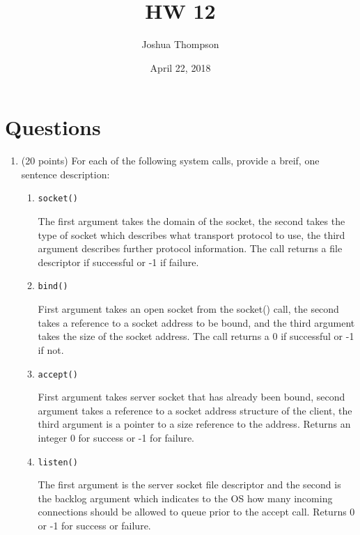 \documentclass{article}[9pt]
\title{HW 12}
\author{Joshua Thompson}
\date{April 22, 2018}
\newenvironment{answerfont}{\fontfamily{qhv}\selectfont}{\par}
\newenvironment{myanswer}{\begin{mdframed}\begin{answerfont}}{\end{answerfont}\end{mdframed}}
\begin{document}
\maketitle
\section*{Questions}
\label{sec:org3ac93b9}

\begin{enumerate}
\item (20 points) For each of the following system calls, provide a breif, one sentence description:

  \begin{enumerate}
  \item \texttt{socket()}
    \begin{myanswer}
    The first argument takes the domain of the socket, the second takes the type of socket which describes what transport protocol to use, the third argument describes further protocol information.
    The call returns a file descriptor if successful or -1 if failure.
    \end{myanswer}

  \item \texttt{bind()}
    \begin{myanswer}
    First argument takes an open socket from the socket() call, the second takes a reference to a socket address to be bound, and the third argument takes the size of the socket address.
    The call returns a 0 if successful or -1 if not.
    \end{myanswer}

  \item \texttt{accept()}
    \begin{myanswer}
    First argument takes server socket that has already been bound, second argument takes a reference to a socket address structure of the client, the third argument is a pointer to a size reference to the address.
    Returns an integer 0 for success or -1 for failure.
    \end{myanswer}

  \item \texttt{listen()}
    \begin{myanswer}
    The first argument is the server socket file descriptor and the second is the backlog argument which indicates to the OS how many incoming connections should be allowed to queue prior to the accept call.
    Returns 0 or -1 for success or failure.
    \end{myanswer}


\end{enumerate}
\end{enumerate}
\end{document}

